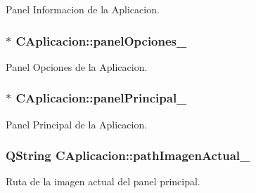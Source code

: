 Panel Informacion de la Aplicacion. 

\subsubsection[{\texorpdfstring{panel\+Opciones\+\_\+}{panelOpciones_}}]{$\ast$ C\+Aplicacion\+::panel\+Opciones\+\_\+\hspace{0.3cm}{\ttfamily [private]}}\hypertarget{classCAplicacion_adc38c4ae217096b72da9911d6cf39f47}{}\label{classCAplicacion_adc38c4ae217096b72da9911d6cf39f47}


Panel Opciones de la Aplicacion. 

\subsubsection[{\texorpdfstring{panel\+Principal\+\_\+}{panelPrincipal_}}]{$\ast$ C\+Aplicacion\+::panel\+Principal\+\_\+\hspace{0.3cm}{\ttfamily [private]}}\hypertarget{classCAplicacion_ac795b4ce529859a5d5c03e15ed78d967}{}\label{classCAplicacion_ac795b4ce529859a5d5c03e15ed78d967}


Panel Principal de la Aplicacion. 

\subsubsection[{\texorpdfstring{path\+Imagen\+Actual\+\_\+}{pathImagenActual_}}]{\setlength{\rightskip}{0pt plus 5cm}Q\+String C\+Aplicacion\+::path\+Imagen\+Actual\+\_\+\hspace{0.3cm}{\ttfamily [private]}}\hypertarget{classCAplicacion_a990b6780cd5e1d941f01e7df20958587}{}\label{classCAplicacion_a990b6780cd5e1d941f01e7df20958587}


Ruta de la imagen actual del panel principal. 

